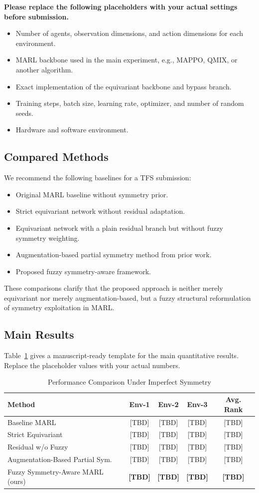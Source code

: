 \documentclass[lettersize,journal]{IEEEtran}
\begin{document}
\textbf{Please replace the following placeholders with your actual settings before submission.}
\begin{itemize}
\item Number of agents, observation dimensions, and action dimensions for each environment.
\item MARL backbone used in the main experiment, e.g., MAPPO, QMIX, or another algorithm.
\item Exact implementation of the equivariant backbone and bypass branch.
\item Training steps, batch size, learning rate, optimizer, and number of random seeds.
\item Hardware and software environment.
\end{itemize}

\subsection{Compared Methods}
We recommend the following baselines for a TFS submission:
\begin{itemize}
\item Original MARL baseline without symmetry prior.
\item Strict equivariant network without residual adaptation.
\item Equivariant network with a plain residual branch but without fuzzy symmetry weighting.
\item Augmentation-based partial symmetry method from prior work.
\item Proposed fuzzy symmetry-aware framework.
\end{itemize}

These comparisons clarify that the proposed approach is neither merely equivariant nor merely augmentation-based, but a fuzzy structural reformulation of symmetry exploitation in MARL.

\subsection{Main Results}
Table~\ref{tab:main_results} gives a manuscript-ready template for the main quantitative results. Replace the placeholder values with your actual numbers.

\begin{table}[!t]
\caption{Performance Comparison Under Imperfect Symmetry\label{tab:main_results}}
\centering
\begin{tabular}{lcccc}
\toprule
Method & Env-1 & Env-2 & Env-3 & Avg. Rank \\
\midrule
Baseline MARL & [TBD] & [TBD] & [TBD] & [TBD] \\
Strict Equivariant & [TBD] & [TBD] & [TBD] & [TBD] \\
Residual w/o Fuzzy & [TBD] & [TBD] & [TBD] & [TBD] \\
Augmentation-Based Partial Sym. & [TBD] & [TBD] & [TBD] & [TBD] \\
Fuzzy Symmetry-Aware MARL (ours) & \textbf{[TBD]} & \textbf{[TBD]} & \textbf{[TBD]} & \textbf{[TBD]} \\
\bottomrule
\end{tabular}
\end{table}
\end{document}
